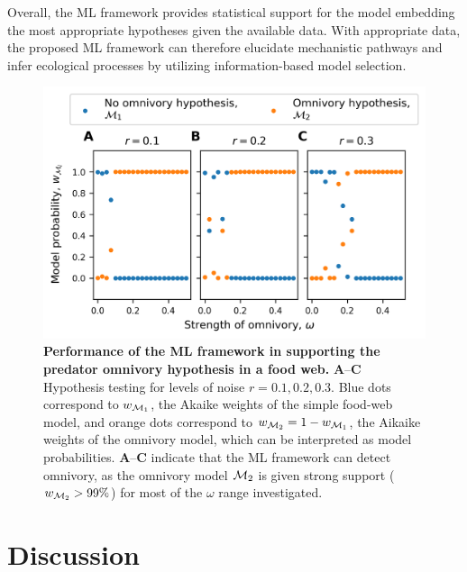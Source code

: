 Overall, the ML framework provides statistical support for the model embedding the most appropriate hypotheses given the available data. With appropriate data, the proposed ML framework can therefore elucidate mechanistic pathways and infer ecological processes by utilizing information-based model selection.

\begin{figure}[h]
    \centering
    \includegraphics[]{figures/figure5.png}
    \caption{\textbf{Performance of the ML framework in supporting the predator omnivory hypothesis in a food web.}
   \textbf{A}--\textbf{C} Hypothesis testing for levels of noise $r=0.1, 0.2, 0.3$. Blue dots correspond to $w_{\mathcal{M}_1}$, the Akaike weights of the simple food-web model, and orange dots correspond to $w_{\mathcal{M}_2} = 1 - w_{\mathcal{M}_1}$, the Aikaike weights of the omnivory model, which can be interpreted as model probabilities. 
   \textbf{A}--\textbf{C} indicate that the ML framework can detect omnivory, as the omnivory model $\mathcal{M}_2$ is given strong support ($w_{\mathcal{M}_2} > 99\%$) for most of the $\omega$ range investigated.
    }
    \label{fig:AIC_likelihood_comparision_3-compartments-model}
\end{figure}

\FloatBarrier

\section{Discussion}\label{sec:discussion}

